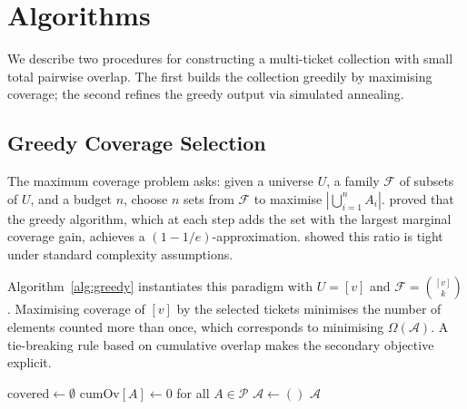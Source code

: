 
\section{Algorithms}
\label{sec:algorithms}

We describe two procedures for constructing a multi-ticket collection with
small total pairwise overlap.  The first builds the collection greedily by
maximising coverage; the second refines the greedy output via simulated
annealing.

\subsection{Greedy Coverage Selection}
\label{sec:algo-greedy}

The maximum coverage problem asks: given a universe $U$, a family
$\mathcal{F}$ of subsets of $U$, and a budget $n$, choose $n$ sets from
$\mathcal{F}$ to maximise $|\bigcup_{i=1}^{n} A_i|$.  \citet{Nemhauser1978}
proved that the greedy algorithm, which at each step adds the set with the
largest marginal coverage gain, achieves a $(1-1/e)$-approximation.
\citet{Feige1998} showed this ratio is tight under standard complexity
assumptions.

Algorithm~\ref{alg:greedy} instantiates this paradigm with $U = [v]$ and
$\mathcal{F} = \binom{[v]}{k}$.  Maximising coverage of $[v]$ by the selected
tickets minimises the number of elements counted more than once, which
corresponds to minimising $\Omega(\mathcal{A})$.  A tie-breaking rule based
on cumulative overlap makes the secondary objective explicit.

\begin{algorithm}[H]
  \caption{Greedy Coverage Selection}
  \label{alg:greedy}
  \BlankLine
  $\mathrm{covered} \leftarrow \emptyset$\;
  $\mathrm{cumOv}[A] \leftarrow 0$ for all $A \in \mathcal{P}$\;
  $\mathcal{A} \leftarrow ()$\;
  \BlankLine
  \Return $\mathcal{A}$\;
\end{algorithm}


